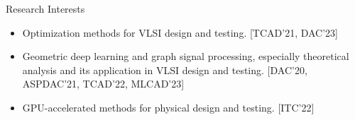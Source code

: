 
\begin{rSection}{Research Interests}
    
\begin{itemize}
    \item Optimization methods for VLSI design and testing. {[TCAD'21, DAC'23]}
    \item Geometric deep learning and graph signal processing, especially theoretical analysis and its application in VLSI design and testing. {[DAC'20, ASPDAC'21, TCAD'22, MLCAD'23]}
    \item GPU-accelerated methods for physical design and testing. {[ITC'22]}
\end{itemize}
\end{rSection}





